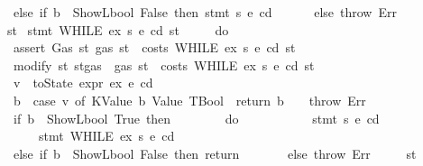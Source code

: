 \begin{isabellebody}
\ \ \ \ \ \ else\ if\ b\ {\isacharequal}{\kern0pt}\ ShowL\isactrlsub b\isactrlsub o\isactrlsub o\isactrlsub l\ False\ then\ stmt\ s{}\ e\ cd\isanewline
\ \ \ \ \ \ else\ throw\ Err\isanewline
\ \ \ \ {\isacharbraceright}{\kern0pt}{\isacharparenright}{\kern0pt}\ st{\isachardoublequoteclose}\isanewline
{\isacharbar}{\kern0pt}\ {\isachardoublequoteopen}stmt\ {\isacharparenleft}{\kern0pt}WHILE\ ex\ s{}{\isacharparenright}{\kern0pt}\ e\ cd\ st\ {\isacharequal}{\kern0pt}\isanewline
\ \ \ \ {\isacharparenleft}{\kern0pt}do\ {\isacharbraceleft}{\kern0pt}\isanewline
\ \ \ \ \ \ assert\ Gas\ {\isacharparenleft}{\kern0pt}{\isasymlambda}st{\isachardot}{\kern0pt}\ gas\ st\ {\isachargreater}{\kern0pt}\ costs\ {\isacharparenleft}{\kern0pt}WHILE\ ex\ s{}{\isacharparenright}{\kern0pt}\ e\ cd\ st{\isacharparenright}{\kern0pt}{\isacharsemicolon}{\kern0pt}\isanewline
\ \ \ \ \ \ modify\ {\isacharparenleft}{\kern0pt}{\isasymlambda}st{\isachardot}{\kern0pt}\ st{\isasymlparr}gas\ {\isacharcolon}{\kern0pt}{\isacharequal}{\kern0pt}\ gas\ st\ {\isacharminus}{\kern0pt}\ costs\ {\isacharparenleft}{\kern0pt}WHILE\ ex\ s{}{\isacharparenright}{\kern0pt}\ e\ cd\ st{\isasymrparr}{\isacharparenright}{\kern0pt}{\isacharsemicolon}{\kern0pt}\isanewline
\ \ \ \ \ \ v\ {\isasymleftarrow}\ toState\ {\isacharparenleft}{\kern0pt}expr\ ex\ e\ cd{\isacharparenright}{\kern0pt}{\isacharsemicolon}{\kern0pt}\isanewline
\ \ \ \ \ \ b\ {\isasymleftarrow}\ {\isacharparenleft}{\kern0pt}case\ v\ of\ {\isacharparenleft}{\kern0pt}KValue\ b{\isacharcomma}{\kern0pt}\ Value\ TBool{\isacharparenright}{\kern0pt}\ {\isasymRightarrow}\ return\ b\ {\isacharbar}{\kern0pt}\ {\isacharunderscore}{\kern0pt}\ {\isasymRightarrow}\ throw\ Err{\isacharparenright}{\kern0pt}{\isacharsemicolon}{\kern0pt}\isanewline
\ \ \ \ \ \ if\ b\ {\isacharequal}{\kern0pt}\ ShowL\isactrlsub b\isactrlsub o\isactrlsub o\isactrlsub l\ True\ then\isanewline
\ \ \ \ \ \ \ \ do\ {\isacharbraceleft}{\kern0pt}\isanewline
\ \ \ \ \ \ \ \ \ \ stmt\ s{}\ e\ cd{\isacharsemicolon}{\kern0pt}\isanewline
\ \ \ \ \ \ \ \ \ \ stmt\ {\isacharparenleft}{\kern0pt}WHILE\ ex\ s{}{\isacharparenright}{\kern0pt}\ e\ cd\isanewline
\ \ \ \ \ \ \ \ {\isacharbraceright}{\kern0pt}\isanewline
\ \ \ \ \ \ else\ if\ b\ {\isacharequal}{\kern0pt}\ ShowL\isactrlsub b\isactrlsub o\isactrlsub o\isactrlsub l\ False\ then\ return\ {\isacharparenleft}{\kern0pt}{\isacharparenright}{\kern0pt}\isanewline
\ \ \ \ \ \ else\ throw\ Err\isanewline
\ \ \ \ {\isacharbraceright}{\kern0pt}{\isacharparenright}{\kern0pt}\ st{\isachardoublequoteclose}\isanewline

\end{isabellebody}
